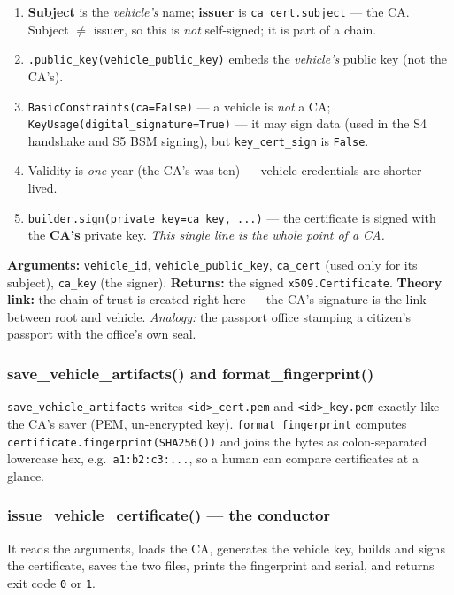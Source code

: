 \documentclass[11pt,a4paper]{report}
\begin{document}
\begin{enumerate}
  \item \textbf{Subject} is the \emph{vehicle's} name; \textbf{issuer} is
        \texttt{ca\_cert.subject} --- the CA. Subject $\ne$ issuer, so this is
        \emph{not} self-signed; it is part of a chain.
  \item \texttt{.public\_key(vehicle\_public\_key)} embeds the \emph{vehicle's}
        public key (not the CA's).
  \item \texttt{BasicConstraints(ca=False)} --- a vehicle is \emph{not} a CA;
        \texttt{KeyUsage(digital\_signature=True)} --- it may sign data (used in
        the S4 handshake and S5 BSM signing), but \texttt{key\_cert\_sign} is
        \texttt{False}.
  \item Validity is \emph{one} year (the CA's was ten) --- vehicle credentials
        are shorter-lived.
  \item \texttt{builder.sign(private\_key=ca\_key, ...)} --- the certificate is
        signed with the \textbf{CA's} private key. \emph{This single line is the
        whole point of a CA.}
\end{enumerate}
\textbf{Arguments:} \texttt{vehicle\_id}, \texttt{vehicle\_public\_key},
\texttt{ca\_cert} (used only for its subject), \texttt{ca\_key} (the signer).
\textbf{Returns:} the signed \texttt{x509.Certificate}.
\textbf{Theory link:} the chain of trust is created right here --- the CA's
signature is the link between root and vehicle. \emph{Analogy:} the passport
office stamping a citizen's passport with the office's own seal.

\subsubsection*{save\_vehicle\_artifacts() and format\_fingerprint()}
\texttt{save\_vehicle\_artifacts} writes \texttt{<id>\_cert.pem} and
\texttt{<id>\_key.pem} exactly like the CA's saver (PEM, un-encrypted key).
\texttt{format\_fingerprint} computes \texttt{certificate.fingerprint(SHA256())}
and joins the bytes as colon-separated lowercase hex, e.g.\
\texttt{a1:b2:c3:...}, so a human can compare certificates at a glance.

\subsubsection*{issue\_vehicle\_certificate() --- the conductor}
It reads the arguments, loads the CA, generates the vehicle key, builds and signs
the certificate, saves the two files, prints the fingerprint and serial, and
returns exit code \texttt{0} or \texttt{1}.
\end{document}
